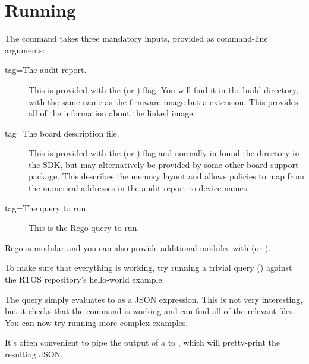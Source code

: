 \section{Running }

The  command takes three mandatory inputs, provided as command-line arguments:

\begin{description}
	\item[tag=The audit report.]{ This is provided with the  (or ) flag.
		You will find it in the build directory, with the same name as the firmware image but a  extension.
		This provides all of the information about the linked image.}
	\item[tag=The board description file.]{ This is provided with the  (or ) flag and normally in found the  directory in the SDK, but may alternatively be provided by some other board support package.
		This describes the memory layout and allows policies to map from the numerical addresses in the audit report to device names.}
	\item[tag=The query to run.]{ This is the Rego query to run.}
\end{description}

Rego is modular and you can also provide additional modules with  (or ).

To make sure that everything is working, try running a trivial query () against the RTOS repository's hello-world example:


The query  simply evaluates to  as a JSON expression.
This is not very interesting, but it checks that the command is working and can find all of the relevant files.
You can now try running more complex examples.

\begin{note}
	It's often convenient to pipe the output of a  to , which will pretty-print the resulting JSON.
\end{note}

